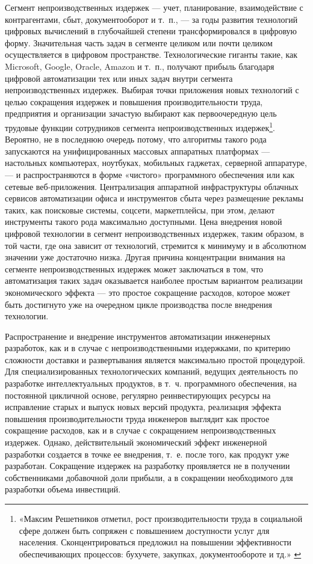 \documentclass{article}
\begin{document}
Сегмент непроизводственных издержек — учет, планирование, взаимодействие с контрагентами, сбыт, документооборот и т.~п., — за годы развития технологий цифровых вычислений в глубочайшей степени трансформировался в цифровую форму. Значительная часть задач в сегменте целиком или почти целиком осуществляется в цифровом пространстве. Технологические гиганты такие, как Microsoft, Google, Oracle, Amazon и т.~п., получают прибыль благодаря цифровой автоматизации тех или иных задач внутри сегмента непроизводственных издержек. Выбирая точки приложения новых технологий с целью сокращения издержек и повышения производительности труда, предприятия и организации зачастую выбирают как первоочередную цель трудовые функции сотрудников сегмента непроизводственных издержек\footnote{«Максим Решетников отметил, рост производительности труда в социальной сфере должен быть сопряжен с повышением доступности услуг для населения. Сконцентрироваться предложил на повышении эффективности обеспечивающих процессов: бухучете, закупках, документообороте и тд.» \cite{minecoLabourProductivitySectorProgramsForMay2025}}. Вероятно, не в последнюю очередь потому, что алгоритмы такого рода запускаются на унифицированных массовых аппаратных платформах — настольных компьютерах, ноутбуках, мобильных гаджетах, серверной аппаратуре, — и распространяются в форме «чистого» программного обеспечения или как сетевые веб-приложения. Централизация аппаратной инфраструктуры облачных сервисов автоматизации офиса и инструментов сбыта через размещение рекламы таких, как поисковые системы, соцсети, маркетплейсы, при этом, делают инструменты такого рода максимально доступными. Цена внедрения новой цифровой технологии в сегмент непроизводственных издержек, таким образом, в той части, где она зависит от технологий, стремится к минимуму и в абсолютном значении уже достаточно низка. Другая причина концентрации внимания на сегменте непроизводственных издержек может заключаться в том, что автоматизация таких задач оказывается наиболее простым вариантом реализации экономического эффекта — это простое сокращение расходов, которое может быть достигнуто уже на очередном цикле производства после внедрения технологии.

Распространение и внедрение инструментов автоматизации инженерных разработок, как и в случае с непроизводственными издержками, по критерию сложности доставки и развертывания является максимально простой процедурой. Для специализированных технологических компаний, ведущих деятельность по разработке интеллектуальных продуктов, в т.~ч. программного обеспечения, на постоянной цикличной основе, регулярно реинвестирующих ресурсы на исправление старых и выпуск новых версий продукта, реализация эффекта повышения производительности труда инженеров выглядит как простое сокращение расходов, как и в случае с сокращением непроизводственных издержек. Однако, действительный экономический эффект инженерной разработки создается в точке ее внедрения, т.~е. после того, как продукт уже разработан. Сокращение издержек на разработку проявляется не в получении собственниками добавочной доли прибыли, а в сокращении необходимого для разработки объема инвестиций.
\end{document}
